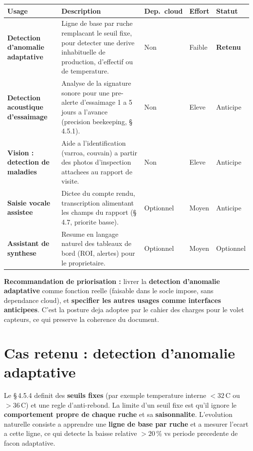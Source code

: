 \begin{xltabular}{\textwidth}{>{\bfseries}p{3.1cm} X C{1.7cm} C{1.7cm} C{1.9cm}}
\toprule
\textbf{Usage} & \textbf{Description} & \textbf{Dep.\ cloud} & \textbf{Effort} & \textbf{Statut} \\
\midrule
\endhead
Detection d'anomalie adaptative &
Ligne de base par ruche remplacant le seuil fixe, pour detecter une derive
inhabituelle de production, d'effectif ou de temperature. &
Non & Faible & \textbf{Retenu} \\
Detection acoustique d'essaimage &
Analyse de la signature sonore pour une pre-alerte d'essaimage 1 a 5 jours a
l'avance (precision beekeeping, §\,4.5.1). &
Non & Eleve & Anticipe \\
Vision : detection de maladies &
Aide a l'identification (varroa, couvain) a partir des photos d'inspection
attachees au rapport de visite. &
Non & Eleve & Anticipe \\
Saisie vocale assistee &
Dictee du compte rendu, transcription alimentant les champs du rapport
(§\,4.7, priorite basse). &
Optionnel & Moyen & Anticipe \\
Assistant de synthese &
Resume en langage naturel des tableaux de bord (ROI, alertes) pour le
proprietaire. &
Optionnel & Moyen & Optionnel \\
\bottomrule
\end{xltabular}

\begin{encadre}
\textbf{Recommandation de priorisation :} livrer la \textbf{detection d'anomalie
adaptative} comme fonction reelle (faisable dans le socle impose, sans
dependance cloud), et \textbf{specifier les autres usages comme interfaces
anticipees}. C'est la posture deja adoptee par le cahier des charges pour le
volet capteurs, ce qui preserve la coherence du document.
\end{encadre}

\section{Cas retenu : detection d'anomalie adaptative}
Le §\,4.5.4 definit des \textbf{seuils fixes} (par exemple temperature interne
$<32$\,\textdegree C ou $>36$\,\textdegree C) et une regle d'anti-rebond. La
limite d'un seuil fixe est qu'il ignore le \textbf{comportement propre de chaque
ruche} et sa \textbf{saisonnalite}. L'evolution naturelle consiste a apprendre
une \textbf{ligne de base par ruche} et a mesurer l'ecart a cette ligne, ce qui
detecte la \og baisse relative $>20$\,\% vs periode precedente \fg{} de facon
adaptative.

